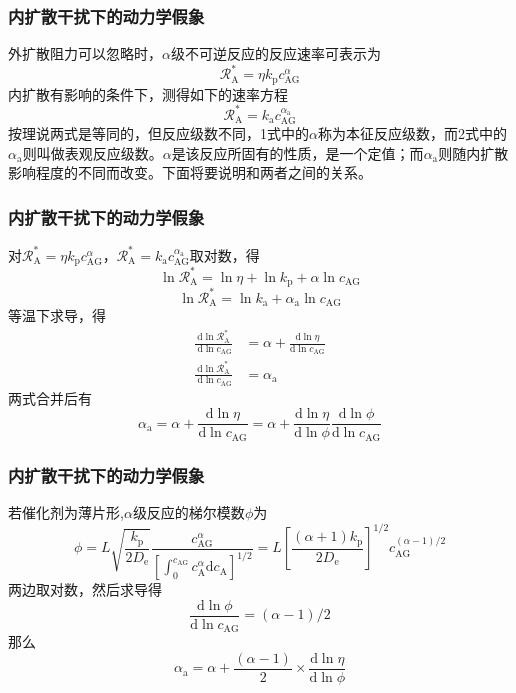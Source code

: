 \documentclass[dvipsnames, svgnames, x11names]{beamer}
\begin{document}
\begin{frame}
    \frametitle{内扩散干扰下的动力学假象}

    外扩散阻力可以忽略时，$\alpha$级不可逆反应的反应速率可表示为
    \[
        \mathscr{R}_{\mathrm{A}}^{*}=\eta k_{\mathrm{p}} c_{\mathrm{AG}}^\alpha
    \]
    内扩散有影响的条件下，测得如下的速率方程
    \[
        \mathscr{R}_{\mathrm{A}}^{*}=k_{\mathrm{a}} c_{\mathrm{AG}}^{\alpha_\mathrm{a}}
    \]
    按理说两式是等同的，但反应级数不同，1式中的$\alpha$称为本征反应级数，而2式中的$\alpha_\mathrm{a}$则叫做表观反应级数。$\alpha$是该反应所固有的性质，是一个定值；而$\alpha_\mathrm{a}$则随内扩散影响程度的不同而改变。下面将要说明和两者之间的关系。

\end{frame}


\begin{frame}
    \frametitle{内扩散干扰下的动力学假象}

    对$\mathscr{R}_{\mathrm{A}}^{*}=\eta k_{\mathrm{p}} c_{\mathrm{AG}}^\alpha$，$\mathscr{R}_{\mathrm{A}}^{*}=k_{\mathrm{a}} c_{\mathrm{AG}}^{\alpha_\mathrm{a}}$取对数，得
    \[
        \ln \mathscr{R}_{\mathrm{A}}^{*}=\ln \eta+\ln k_{\mathrm{p}}+\alpha \ln c_{\mathrm{AG}}
    \]
    \[
        \ln \mathscr{R}_{\mathrm{A}}^{*}= \ln k_{\mathrm{a}}+\alpha_\mathrm{a} \ln c_{\mathrm{AG}}
    \]
    等温下求导，得
    \[
        \begin{aligned}
             \frac{\mathrm{d} \ln \mathscr{R}_{\mathrm{A}}^{*}}{\mathrm{~d} \ln c_{\mathrm{AG}}}&=\alpha+\frac{\mathrm{d} \ln \eta}{\mathrm{d} \ln c_{\mathrm{AG}}}\\
             \frac{\mathrm{d} \ln \mathscr{R}_{\mathrm{A}}^{*}}{\mathrm{~d} \ln c_{\mathrm{AG}}}&=\alpha_{\mathrm{a}}
        \end{aligned}
    \]
    两式合并后有
    \[
        \alpha_{\mathrm{a}}=\alpha+\frac{\mathrm{d} \ln \eta}{\mathrm{d} \ln c_{\mathrm{AG}}}=\alpha+\frac{\mathrm{d} \ln \eta}{\mathrm{d} \ln \phi} \frac{\mathrm{d} \ln \phi}{\mathrm{d} \ln c_{\mathrm{AG}}}
    \]

\end{frame}


\begin{frame}
    \frametitle{内扩散干扰下的动力学假象}

    若催化剂为薄片形,$\alpha$级反应的梯尔模数$\phi$为
    \[
        \phi=L \sqrt{\frac{k_{\mathrm{p}}}{2 D_{\mathrm{e}}}} \frac{c_\mathrm{AG}^{\alpha}}{\left[\int_{0}^{c_{\mathrm{AG}}} c_{\mathrm{A}}^{\alpha} \mathrm{d} c_{\mathrm{A}}\right]^{1 / 2}}=L\left[\frac{(\alpha+1) k_{\mathrm{p}}}{2 D_{\mathrm{e}}}\right]^{1 / 2} c_{\mathrm{AG}}^{(\alpha-1) / 2}
    \]
    两边取对数，然后求导得
    \[
        \frac{\mathrm{d} \ln \phi}{\mathrm{d} \ln c_{\mathrm{AG}}} =(\alpha-1) / 2
    \]
    那么
    \[
        \alpha_{\mathrm{a}}=\alpha+\frac{(\alpha-1)}{2} \times \frac{\mathrm{d} \ln \eta}{\mathrm{d} \ln \phi}
    \]
    

\end{frame}
\end{document}
